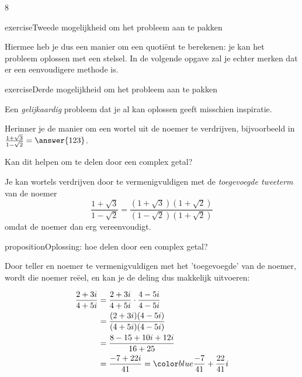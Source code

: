 8\documentclass{ximera}
\begin{document}
{\begin{expandable}{exercise}{Tweede mogelijkheid om het probleem aan te pakken}
\begin{oplossing}
                Hiermee heb je dus een manier om een quotiënt te berekenen: je kan het probleem oplossen met een stelsel.
                In de volgende opgave zal je echter merken dat er een eenvoudigere methode is.
            \end{oplossing}
    \end{expandable}

    \begin{expandable}{exercise}{Derde mogelijkheid om het probleem aan te pakken}

        Een \textit{gelijkaardig} probleem dat je al kan oplossen geeft misschien inspiratie.

        \begin{hint} 
        Herinner je de manier om een wortel uit de noemer te verdrijven, bijvoorbeeld in
        $
        \frac{1+\sqrt{3}}{1-\sqrt{2}} = \answer{123}
        $.

        Kan dit helpen om te delen door een complex getal?
        \end{hint}
        \begin{hint}
            Je kan wortels verdrijven door te vermenigvuldigen met de \textit{toegevoegde tweeterm} van de noemer
            $$
            \frac{1+\sqrt{3}}{1-\sqrt{2}} = \frac{(1+\sqrt{3})(1+\sqrt{2})}{(1-\sqrt{2})(1+\sqrt{2})}
            $$
            omdat de noemer dan erg vereenvoudigt.
        \end{hint}
    \end{expandable}

    \begin{expandable}{proposition}{Oplossing: hoe delen door een complex getal?}

        Door teller en noemer te vermenigvuldigen met het 'toegevoegde' van de noemer, wordt die noemer reëel, en kan je de deling dus makkelijk uitvoeren:

                \begin{align*}
                   \frac{2+3i}{4+5i} & = \frac{2+3i}{4+5i} \cdot \frac{4-5i}{4-5i} \\
                                     & = \frac{(2+3i)(4-5i)}{(4+5i)(4-5i)}  \\
                                     & = \frac{8-15+10i+ 12i}{16+25}  \\
                                     & = \frac{-7+22i}{41} =\blue{\frac{-7}{41}+\frac{22}{41}i} 
                \end{align*}
    \end{expandable}

    }  %
\end{document}
